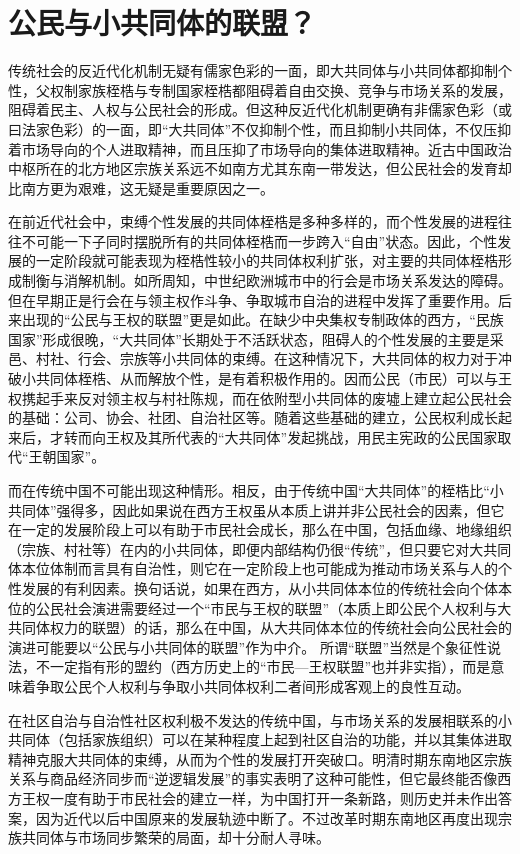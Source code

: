 \documentclass[a4paper,12pt,punct=kaiming]{ctexart}
\begin{document}
\section*{公民与小共同体的联盟？}

传统社会的反近代化机制无疑有儒家色彩的一面，即大共同体与小共同体都抑制个性，父权制家族桎梏与专制国家桎梏都阻碍着自由交换、竞争与市场关系的发展，阻碍着民主、人权与公民社会的形成。但这种反近代化机制更确有非儒家色彩（或曰法家色彩）的一面，即“大共同体”不仅抑制个性，而且抑制小共同体，不仅压抑着市场导向的个人进取精神，而且压抑了市场导向的集体进取精神。近古中国政治中枢所在的北方地区宗族关系远不如南方尤其东南一带发达，但公民社会的发育却比南方更为艰难，这无疑是重要原因之一。

在前近代社会中，束缚个性发展的共同体桎梏是多种多样的，而个性发展的进程往往不可能一下子同时摆脱所有的共同体桎梏而一步跨入“自由”状态。因此，个性发展的一定阶段就可能表现为桎梏性较小的共同体权利扩张，对主要的共同体桎梏形成制衡与消解机制。如所周知，中世纪欧洲城市中的行会是市场关系发达的障碍。但在早期正是行会在与领主权作斗争、争取城市自治的进程中发挥了重要作用。后来出现的“公民与王权的联盟”更是如此。在缺少中央集权专制政体的西方，“民族国家”形成很晚，“大共同体”长期处于不活跃状态，阻碍人的个性发展的主要是采邑、村社、行会、宗族等小共同体的束缚。在这种情况下，大共同体的权力对于冲破小共同体桎梏、从而解放个性，是有着积极作用的。因而公民（市民）可以与王权携起手来反对领主权与村社陈规，而在依附型小共同体的废墟上建立起公民社会的基础：公司、协会、社团、自治社区等。随着这些基础的建立，公民权利成长起来后，才转而向王权及其所代表的“大共同体”发起挑战，用民主宪政的公民国家取代“王朝国家”。

而在传统中国不可能出现这种情形。相反，由于传统中国“大共同体”的桎梏比“小共同体”强得多，因此如果说在西方王权虽从本质上讲并非公民社会的因素，但它在一定的发展阶段上可以有助于市民社会成长，那么在中国，包括血缘、地缘组织（宗族、村社等）在内的小共同体，即便内部结构仍很“传统”，但只要它对大共同体本位体制而言具有自治性，则它在一定阶段上也可能成为推动市场关系与人的个性发展的有利因素。换句话说，如果在西方，从小共同体本位的传统社会向个体本位的公民社会演进需要经过一个“市民与王权的联盟”（本质上即公民个人权利与大共同体权力的联盟）的话，那么在中国，从大共同体本位的传统社会向公民社会的演进可能要以“公民与小共同体的联盟”作为中介。 所谓“联盟”当然是个象征性说法，不一定指有形的盟约（西方历史上的“市民—王权联盟”也并非实指），而是意味着争取公民个人权利与争取小共同体权利二者间形成客观上的良性互动。

在社区自治与自治性社区权利极不发达的传统中国，与市场关系的发展相联系的小共同体（包括家族组织）可以在某种程度上起到社区自治的功能，并以其集体进取精神克服大共同体的束缚，从而为个性的发展打开突破口。明清时期东南地区宗族关系与商品经济同步而“逆逻辑发展”的事实表明了这种可能性，但它最终能否像西方王权一度有助于市民社会的建立一样，为中国打开一条新路，则历史并未作出答案，因为近代以后中国原来的发展轨迹中断了。不过改革时期东南地区再度出现宗族共同体与市场同步繁荣的局面，却十分耐人寻味。
\end{document}
